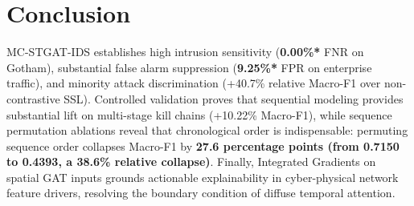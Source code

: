 \documentclass[10pt,a4paper]{article}
\newcommand{\best}[1]{\textbf{\textcolor{bestgreen}{#1*}}}
\begin{document}
\section{Conclusion}
MC-STGAT-IDS establishes high intrusion sensitivity (\best{0.00\%} FNR on Gotham), substantial false alarm suppression (\best{9.25\%} FPR on enterprise traffic), and minority attack discrimination (+40.7\% relative Macro-F1 over non-contrastive SSL). Controlled validation proves that sequential modeling provides substantial lift on multi-stage kill chains (+10.22\% Macro-F1), while sequence permutation ablations reveal that chronological order is indispensable: permuting sequence order collapses Macro-F1 by \textbf{27.6 percentage points (from 0.7150 to 0.4393, a 38.6\% relative collapse)}. Finally, Integrated Gradients on spatial GAT inputs grounds actionable explainability in cyber-physical network feature drivers, resolving the boundary condition of diffuse temporal attention.
\end{document}
